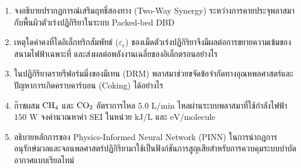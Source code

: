 \begin{enumerate}
    \item จงอธิบายปรากฏการณ์เสริมฤทธิ์สองทาง (Two-Way Synergy) ระหว่างการคายประจุพลาสมากับพื้นผิวตัวเร่งปฏิกิริยาในระบบ Packed-bed DBD
    \item เหตุใดค่าคงที่ไดอิเล็กทริกสัมพัทธ์ ($\varepsilon_{\text{r}}$) ของเม็ดตัวเร่งปฏิกิริยาจึงมีผลต่อการขยายความเข้มของสนามไฟฟ้าเฉพาะที่ และส่งผลต่อพลังงานเฉลี่ยของอิเล็กตรอนอย่างไร
    \item ในปฏิกิริยาดรายรีฟอร์มมิ่งของมีเทน (DRM) พลาสมาช่วยขจัดข้อจำกัดทางอุณหพลศาสตร์และปัญหาการเกิดคราบคาร์บอน (Coking) ได้อย่างไร
    \item ก๊าซผสม $\ce{CH4}$ และ $\ce{CO2}$ อัตราการไหล $5.0 \text{ L/min}$ ไหลผ่านระบบพลาสมาที่ใช้กำลังไฟฟ้า $150 \text{ W}$ จงคำนวณหาค่า SEI ในหน่วย $\text{kJ/L}$ และ $\text{eV/molecule}$
    \item อธิบายหลักการของ Physics-Informed Neural Network (PINN) ในการนำกฎการอนุรักษ์มวลและจลนพลศาสตร์ปฏิกิริยามาใช้เป็นฟังก์ชันการสูญเสียสำหรับการควบคุมระบบบำบัดอากาศแบบเรียลไทม์
\end{enumerate}
